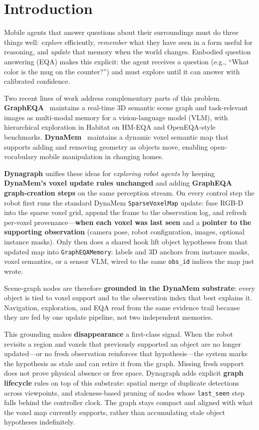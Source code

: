 \section{Introduction}
\label{sec:introduction}

Mobile agents that answer questions about their surroundings must do three things well: \emph{explore} efficiently, \emph{remember} what they have seen in a form useful for reasoning, and \emph{update} that memory when the world changes.
Embodied question answering (EQA) makes this explicit: the agent receives a question (e.g., ``What color is the mug on the counter?'') and must explore until it can answer with calibrated confidence.

Two recent lines of work address complementary parts of this problem.
\textbf{GraphEQA}~\citep{saxena2024grapheqa} maintains a real-time 3D semantic scene graph and task-relevant images as multi-modal memory for a vision-language model (VLM), with hierarchical exploration in Habitat on HM-EQA and OpenEQA-style benchmarks.
\textbf{DynaMem}~\citep{liu2024dynamem} maintains a dynamic voxel semantic map that supports adding and removing geometry as objects move, enabling open-vocabulary mobile manipulation in changing homes.

\textbf{Dynagraph} unifies these ideas for \emph{exploring robot agents} by keeping \textbf{DynaMem's voxel update rules unchanged} and adding \textbf{GraphEQA graph-creation steps} on the same perception stream.
On every control step the robot first runs the standard DynaMem \texttt{SparseVoxelMap} update: fuse RGB-D into the sparse voxel grid, append the frame to the observation log, and refresh per-voxel provenance---\textbf{when each voxel was last seen} and a \textbf{pointer to the supporting observation} (camera pose, robot configuration, images, optional instance masks).
Only then does a shared hook lift object hypotheses from that updated map into \texttt{GraphEQAMemory}: labels and 3D anchors from instance masks, voxel semantics, or a sensor VLM, wired to the same \texttt{obs\_id} indices the map just wrote.

Scene-graph nodes are therefore \textbf{grounded in the DynaMem substrate}: every object is tied to voxel support and to the observation index that best explains it.
Navigation, exploration, and EQA read from the same evidence trail because they are fed by one update pipeline, not two independent memories.

This grounding makes \textbf{disappearance} a first-class signal.
When the robot revisits a region and voxels that previously supported an object are no longer updated---or no fresh observation reinforces that hypothesis---the system marks the hypothesis as stale and can retire it from the graph. Missing fresh support does not prove physical absence or free space.
Dynagraph adds explicit \textbf{graph lifecycle} rules on top of this substrate: spatial merge of duplicate detections across viewpoints, and staleness-based pruning of nodes whose \texttt{last\_seen} step falls behind the controller clock.
The graph stays compact and aligned with what the voxel map currently supports, rather than accumulating stale object hypotheses indefinitely.

